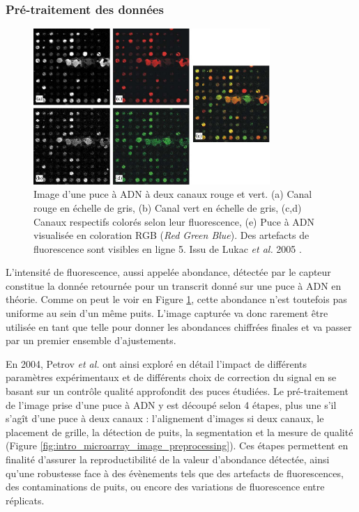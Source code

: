 

\subsubsection{Pré-traitement des données}

\begin{figure}[!h]
    \centering
    \includegraphics[width=0.8\textwidth]{img/intro/2_meth_transcripto/intro_2_true_microarray_picture_10.1016_j.fss.2004.10.012.png}
    \caption[Image d'une puce à ADN à deux canaux rouge et vert]{Image d'une puce à ADN à deux canaux rouge et vert. (a) Canal rouge en échelle de gris, (b) Canal vert en échelle de gris, (c,d) Canaux respectifs colorés selon leur fluorescence, (e) Puce à ADN visualisée en coloration RGB (\textit{Red Green Blue}). Des artefacts de fluorescence sont visibles en ligne 5. Issu de Lukac \textit{et al.} 2005 \cite{Lukac2005May}.}
    \label{fig:intro_true_microarray_picture}
\end{figure}

L'intensité de fluorescence, aussi appelée abondance, détectée par le capteur constitue la donnée retournée pour un transcrit donné sur une puce à ADN en théorie. Comme on peut le voir en Figure \ref{fig:intro_true_microarray_picture}, cette abondance n'est toutefois pas uniforme au sein d'un même puits. L'image capturée va donc rarement être utilisée en tant que telle pour donner les abondances chiffrées finales et va passer par un premier ensemble d'ajustements.

En 2004, Petrov \textit{et al.} \cite{Petrov2004Nov} ont ainsi exploré en détail l'impact de différents paramètres expérimentaux et de différents choix de correction du signal en se basant sur un contrôle qualité approfondit des puces étudiées. Le pré-traitement de l'image prise d'une puce à ADN y est découpé selon 4 étapes, plus une s'il s'agît d'une puce à deux canaux : l'alignement d'images si deux canaux, le placement de grille, la détection de puits, la segmentation et la mesure de qualité (Figure \ref{fig:intro_microarray_image_preprocessing}). Ces étapes permettent en finalité d'assurer la reproductibilité de la valeur d'abondance détectée, ainsi qu'une robustesse face à des évènements tels que des artefacts de fluorescences, des contaminations de puits, ou encore des variations de fluorescence entre réplicats.

